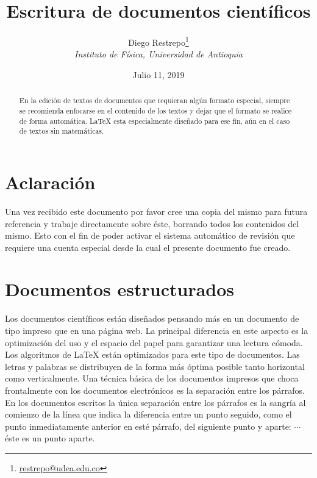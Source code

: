 \documentclass{article}
\title{Escritura de documentos científicos}
\author{Diego Restrepo\footnote{\href{mailto:restrepo@udea.edu.co}{restrepo@udea.edu.co}}\\
\textit{\small  Instituto de Física, Universidad de Antioquia}
}
\date{\small Julio 11, 2019}
\begin{document}



\maketitle

\begin{abstract}
En la edición de textos de documentos que requieran algún formato
especial, siempre se recomienda enfocarse en el contenido de los textos y
dejar que el formato se realice de forma automática. \LaTeX{} esta especialmente diseñado para ese fin, aún en el caso de textos sin matemáticas.
\end{abstract}
\section{Aclaración}
Una vez recibido este documento por favor cree una copia del mismo para futura referencia y trabaje directamente sobre éste, borrando todos los contenidos del mismo. Esto con el fin de poder activar el sistema automático de revisión que requiere una cuenta especial desde la cual el presente documento fue creado. 
\section{Documentos estructurados}
Los documentos científicos están diseñados pensando más en un documento de tipo impreso que en una página web. La principal diferencia en este aspecto es la optimización del uso y el espacio del papel para garantizar una lectura cómoda. Los algoritmos de \LaTeX{} están optimizados para este tipo de documentos. Las letras y palabras se distribuyen de la forma más óptima posible tanto horizontal como verticalmente. Una técnica básica de los documentos impresos que choca frontalmente con los documentos electrónicos es la separación entre los párrafos. En los documentos escritos la única separación entre los párrafos es la sangría al comienzo de la línea que indica la diferencia entre un punto seguido, como el punto inmediatamente anterior en esté párrafo, del siguiente punto y aparte:  $\cdots$ \hfill éste es un punto aparte.
\end{document}
